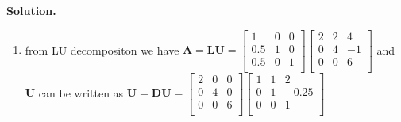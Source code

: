 \documentclass[english,onecolumn]{IEEEtran}
\begin{document}
\noindent\textbf{Solution.}
\begin{enumerate}
    \item 
    from LU decompositon we have
    $\mathbf{A}=\mathbf{L}\mathbf{U}=
    \begin{bmatrix}
    1 & 0 & 0\\
    0.5 & 1 & 0\\
    0.5 & 0 & 1\\
    \end{bmatrix}
	\begin{bmatrix}
	2 & 2 & 4\\
	0 & 4 & -1\\
	0 & 0 & 6\\
	\end{bmatrix}    
    $
    and $\mathbf{U}$ can be written as 
    $\mathbf{U}=\mathbf{D}\mathbf{U}=
    \begin{bmatrix}
    2 & 0 & 0\\
    0 & 4 & 0\\
    0 & 0 & 6\\
    \end{bmatrix}
    \begin{bmatrix}
	1 & 1 & 2\\
	0 & 1 & -0.25\\
	0 & 0 & 1\\
	\end{bmatrix}$
	\\\\
    
    
    

\end{enumerate}
\end{document}
